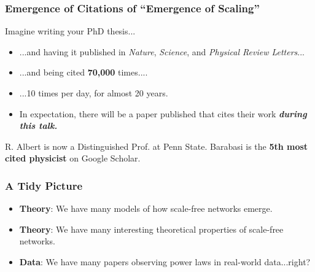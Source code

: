 \documentclass{beamer}
\begin{document}
		\begin{frame}\frametitle{Emergence of Citations of ``Emergence of Scaling''}
			Imagine writing your PhD thesis...
			\begin{itemize}
				\pause \item ...and having it published in \emph{Nature}, \emph{Science}, and \emph{Physical Review Letters}...
				\pause \item ...and being cited \textbf{70,000} times....  
				\pause \item ...10 times per day, for almost 20 years. 
				\pause \item In expectation, there will be a paper published that cites their work \textbf{\emph{during this talk.}}
			\end{itemize}
			\pause R. Albert is now a Distinguished Prof. at Penn State. Barabasi is the \textbf{5th most cited physicist} on Google Scholar. 
		\end{frame}
	
		
		\begin{frame}\frametitle{A Tidy Picture}
		  	\begin{itemize}
		  		\item \textbf{Theory}: We have many models of how scale-free networks emerge. 
		  		\item \textbf{Theory}: We have many interesting theoretical properties of scale-free networks. 
		  		\item \textbf{Data}: We have many papers observing power laws in real-world data...right? 
		  	\end{itemize}
		\end{frame}
	
		
\end{document}

